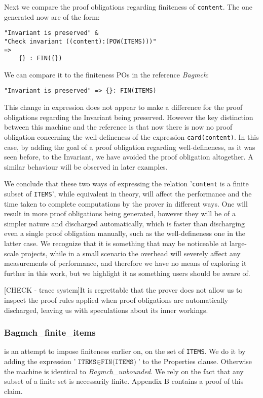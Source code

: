 \documentclass[11pt,journal]{IEEEtran}
\begin{document}
	Next we compare the proof obligations regarding finiteness of \texttt{content}. The one generated now are of the form:
	
	\begin{lstlisting}
"Invariant is preserved" &
"Check invariant ((content):(POW(ITEMS)))" 
=>
	{} : FIN({}) 
	\end{lstlisting}
	
	We can compare it to the finiteness POs in the reference \emph{Bagmch}:
	
	\begin{lstlisting}
"Invariant is preserved" => {}: FIN(ITEMS)  
	\end{lstlisting}
	
	This change in expression does not appear to make a difference for the proof obligations regarding the Invariant being preserved. However the key distinction between this machine and the reference is that now there is now no proof obligation concerning the well-defineness of the expression \texttt{card(content)}. In this case, by adding the goal of a proof obligation regarding well-defineness, as it was seen before, to the Invariant, we have avoided the proof obligation altogether. A similar behaviour will be observed in later examples.
	
	We conclude that these two ways of expressing the relation '\texttt{content} is a finite subset of \texttt{ITEMS}', while equivalent in theory, will affect the performance and the time taken to complete computations by the prover in different ways. One will result in more proof obligations being generated, however they will be of a simpler nature and discharged automatically, which is faster than discharging even a single proof obligation manually, such as the well-defineness one in the latter case. We recognize that it is something that may be noticeable at large-scale projects, while in a small scenario the overhead will severely affect any measurements of performance, and therefore we have no means of exploring it further in this work, but we highlight it as something users should be aware of.
	
	[CHECK - trace system]It is regrettable that the prover does not allow us to inspect the proof rules applied when proof obligations are automatically discharged, leaving us with speculations about its inner workings.
	       
	\subsubsection{Bagmch\_finite\_items} is an attempt to impose finiteness earlier on, on the set of \texttt{ITEMS}. We do it by adding the expression '$\texttt{ITEMS} \in \texttt{FIN(ITEMS)}$' to the Properties clause. Otherwise the machine is identical to \emph{Bagmch\_unbounded}. We rely on the fact that any subset of a finite set is necessarily finite. Appendix B contains a proof of this claim.
	
\end{document}
